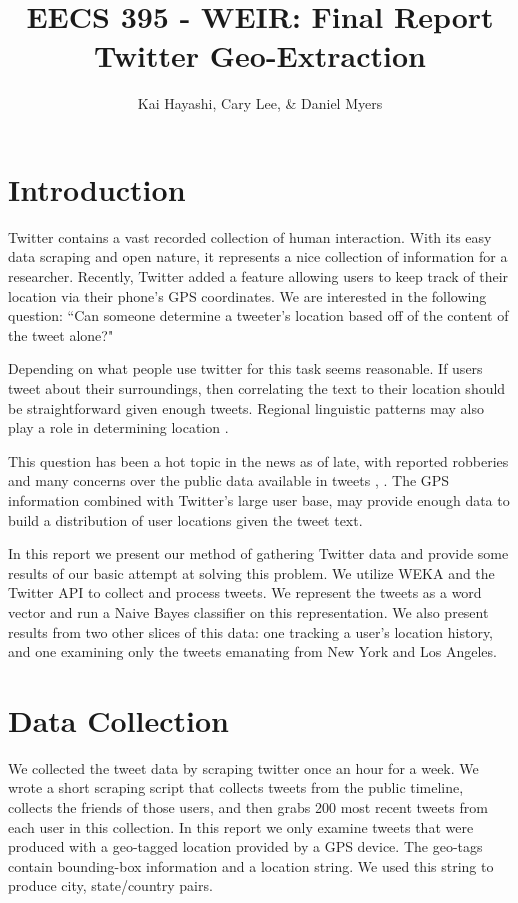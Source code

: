 \documentclass[12pt]{article}
\title{EECS 395 - WEIR: Final Report \\ Twitter Geo-Extraction}
\author{Kai Hayashi, Cary Lee, \& Daniel Myers}
\date{}                                           %
\begin{document}
\maketitle
\section*{Introduction}
Twitter contains a vast recorded collection of human interaction. With its easy data scraping and open nature, it represents a nice collection of information for a researcher. Recently, Twitter added a feature allowing users to keep track of their location via their phone's GPS coordinates. We are interested in the following question: ``Can someone determine a tweeter's location based off of the content of the tweet alone?" 

Depending on what people use twitter for this task seems reasonable. If users tweet about their surroundings, then correlating the text to their location should be straightforward given enough tweets. Regional linguistic patterns may also play a role in determining location \cite{Zcheng}.

This question has been a hot topic in the news as of late, with reported robberies and many concerns over the public data available in tweets \cite{twrob}, \cite{twpriv}. The GPS information combined with Twitter's large user base, may provide enough data to build a distribution of user locations given the tweet text. 

In this report we present our method of gathering Twitter data and provide some results of our basic attempt at solving this problem. We utilize WEKA and the Twitter API to collect and process tweets. We represent the tweets as a word vector and run a Naive Bayes classifier on this representation. We also present results from two other slices of this data: one tracking a user's location history, and one examining only the tweets emanating from New York and Los Angeles. 

\section*{Data Collection}
We collected the tweet data by scraping twitter once an hour for a week. We wrote a short scraping script that collects tweets from the public timeline, collects the friends of those users, and then grabs 200 most recent tweets from each user in this collection. In this report we only examine tweets that were produced with a geo-tagged location provided by a GPS device. The geo-tags contain bounding-box information and a location string. We used this string to produce city, state/country pairs. 
\end{document}
